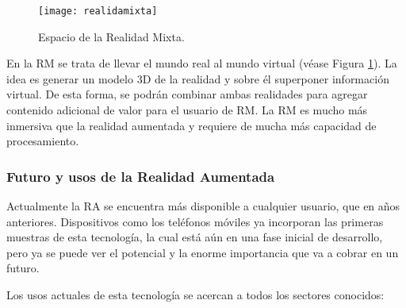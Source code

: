 \begin{figure}[h]
    \centering
    \texttt{[image: realidamixta]}
    \caption{ Espacio de la Realidad Mixta. }
    \label{fig:realidadMixta}
\end{figure}

En la RM se trata de llevar el mundo real al mundo virtual (véase Figura \ref{fig:realidadMixta}). La idea es generar un modelo 3D de la realidad y sobre él superponer información virtual. De esta forma, se podrán combinar ambas realidades para agregar contenido adicional de valor para el usuario de RM. La RM es mucho más inmersiva que la realidad aumentada y requiere de mucha más capacidad de procesamiento. 

\subsubsection{Futuro y usos de la Realidad Aumentada}
Actualmente la RA se encuentra más disponible a cualquier usuario, que en años anteriores. 
Dispositivos como los teléfonos móviles ya incorporan las primeras muestras de esta tecnología, la cual está aún en una fase inicial de desarrollo, pero ya se puede ver el potencial y la enorme importancia 
que va a cobrar en un futuro.

Los usos actuales de esta tecnología se acercan a todos los sectores conocidos:

